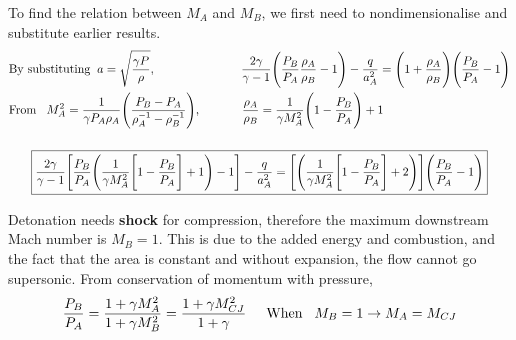 \documentclass[a4paper,10pt]{article}
\begin{document}
\vspace*{-0.6cm}
To find the relation between $M_A$ and $M_B$, we first need to nondimensionalise and substitute earlier results.
\begin{gather*}
    \begin{split}
        &\text{By substituting}\hspace*{0.2cm}a = \sqrt{\frac{\gamma P}{\rho}},\hspace*{2.5cm}\frac{2\gamma}{\gamma-1}\Bigg(\frac{P_B}{P_A}\frac{\rho_A}{\rho_B}-1\Bigg)-\frac{q}{a_A^2} = \Bigg(1+\frac{\rho_A}{\rho_B}\Bigg)\Bigg(\frac{P_B}{P_A}-1\Bigg)\\
        &\text{From}\hspace*{0.3cm}M_A^2 = \frac{1}{\gamma P_A\rho_A}\Bigg(\frac{P_B-P_A}{\rho_A^{-1}-\rho_B^{-1}}\Bigg),\hspace*{1.2cm}\frac{\rho_A}{\rho_B}=\frac{1}{\gamma M_A^2}\Bigg(1-\frac{P_B}{P_A}\Bigg)+1
    \end{split}\\[0.5cm]
    \boxed{\frac{2\gamma}{\gamma-1}\Bigg[\frac{P_B}{P_A}\Bigg(\frac{1}{\gamma M_A^2}\Bigg[1-\frac{P_B}{P_A}\Bigg]+1\Bigg)-1\Bigg]-\frac{q}{a_A^2}=\Bigg[\Bigg(\frac{1}{\gamma M_A^2}\Bigg[1-\frac{P_B}{P_A}\Bigg]+2\Bigg)\Bigg]\Bigg(\frac{P_B}{P_A}-1\Bigg)}
\end{gather*}

Detonation needs \textbf{shock} for compression, therefore the maximum downstream Mach number is $M_B=1$. This is due to the added energy and combustion, and the fact that the area is constant and without expansion, the flow cannot go supersonic. From conservation of momentum with pressure,
\begin{gather*}
    \frac{P_B}{P_A} = \frac{1+\gamma M_A^2}{1+\gamma M_B^2} = \frac{1+\gamma M_{CJ}^2}{1+\gamma}\hspace*{0.5cm}\text{When}\hspace*{0.3cm}M_B=1\rightarrow M_A = M_{CJ} 
\end{gather*}
\end{document}

